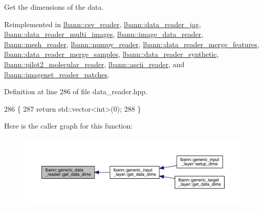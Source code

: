 Get the dimensions of the data. 



Reimplemented in \hyperlink{classlbann_1_1csv__reader_a6fab46f562936d43d19e0eaacf8b72c0}{lbann\+::csv\+\_\+reader}, \hyperlink{classlbann_1_1data__reader__jag_af724f9e38e98e9a4d46f18e7ccadcbb3}{lbann\+::data\+\_\+reader\+\_\+jag}, \hyperlink{classlbann_1_1data__reader__multi__images_aca93e0ab0edf13397de414d41aff1cd1}{lbann\+::data\+\_\+reader\+\_\+multi\+\_\+images}, \hyperlink{classlbann_1_1image__data__reader_a1bb05018e059afae76d46a2a908dd75c}{lbann\+::image\+\_\+data\+\_\+reader}, \hyperlink{classlbann_1_1mesh__reader_a8845023baeb8e9c51f3d690347b1213f}{lbann\+::mesh\+\_\+reader}, \hyperlink{classlbann_1_1numpy__reader_aad4adc242e92334d016127cedc66fc70}{lbann\+::numpy\+\_\+reader}, \hyperlink{classlbann_1_1data__reader__merge__features_aa0cd0caf93ad18f496bf80d7cafa5527}{lbann\+::data\+\_\+reader\+\_\+merge\+\_\+features}, \hyperlink{classlbann_1_1data__reader__merge__samples_a09103cb5c42e03819fa44bf4e6d71752}{lbann\+::data\+\_\+reader\+\_\+merge\+\_\+samples}, \hyperlink{classlbann_1_1data__reader__synthetic_a5ee6a8ee02a6ff788988ae427ccf4aa5}{lbann\+::data\+\_\+reader\+\_\+synthetic}, \hyperlink{classlbann_1_1pilot2__molecular__reader_a0a59a7a38c01c4d8716fb24d36663c99}{lbann\+::pilot2\+\_\+molecular\+\_\+reader}, \hyperlink{classlbann_1_1ascii__reader_afcd9c809960f236996e7838a995c0edd}{lbann\+::ascii\+\_\+reader}, and \hyperlink{classlbann_1_1imagenet__reader__patches_a4d5c6b9780908d9beb5c6d3f017c38b5}{lbann\+::imagenet\+\_\+reader\+\_\+patches}.



Definition at line 286 of file data\+\_\+reader.\+hpp.


\begin{DoxyCode}
286                                                      \{
287     \textcolor{keywordflow}{return} std::vector<int>(0);
288   \}
\end{DoxyCode}
Here is the caller graph for this function\+:\nopagebreak
\begin{figure}[H]
\begin{center}
\leavevmode
\includegraphics[width=350pt]{classlbann_1_1generic__data__reader_ae06ff27459ac4a5d8ac14655d4b31318_icgraph}
\end{center}
\end{figure}
\mbox{\label{classlbann_1_1generic__data__reader_a56664e1b43f3fe923cf6d652f14b40a9}} 

